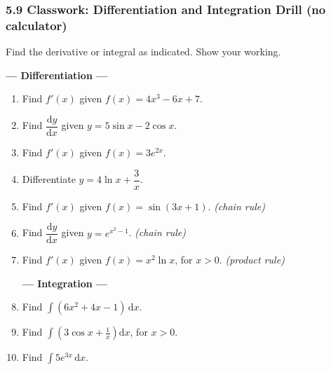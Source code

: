 \documentclass[12pt, twoside]{article}
\begin{document}
\subsubsection*{5.9 Classwork: Differentiation and Integration Drill (no calculator)}

Find the derivative or integral as indicated. Show your working.

\textbf{--- Differentiation ---}
\bigskip
\begin{enumerate}[itemsep=0.3cm]


\item Find $f'(x)$ given $f(x) = 4x^3 - 6x + 7$.
\vspace{1.2cm}

\item Find $\dfrac{\mathrm{d}y}{\mathrm{d}x}$ given $y = 5\sin x - 2\cos x$.
\vspace{1.2cm}

\item Find $f'(x)$ given $f(x) = 3e^{2x}$.
\vspace{1.2cm}

\item Differentiate $y = 4\ln x + \dfrac{3}{x}$.
\vspace{1.5cm}

\item Find $f'(x)$ given $f(x) = \sin(3x + 1)$.
\hfill \emph{(chain rule)}
\vspace{1.5cm}

\item Find $\dfrac{\mathrm{d}y}{\mathrm{d}x}$ given $y = e^{x^2 - 1}$.
\hfill \emph{(chain rule)}
\vspace{1.5cm}

\item Find $f'(x)$ given $f(x) = x^2 \ln x$, for $x > 0$.
\hfill \emph{(product rule)}
\vspace{1.5cm}

\newpage
\textbf{--- Integration ---}

\item Find $\displaystyle\int (6x^2 + 4x - 1)\,\mathrm{d}x$.
\vspace{1.5cm}

\item Find $\displaystyle\int \left(3\cos x + \frac{1}{x}\right)\mathrm{d}x$,
\quad for $x > 0$.
\vspace{1.5cm}

\item Find $\displaystyle\int 5e^{3x}\,\mathrm{d}x$.
\vspace{1.5cm}


\end{enumerate}
\end{document}
